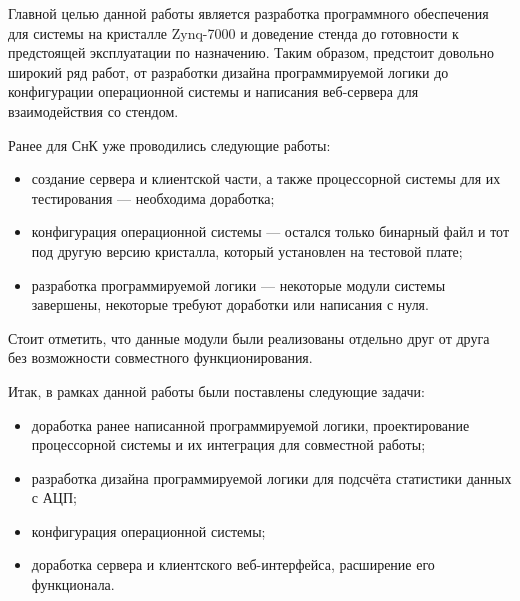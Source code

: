 Главной целью данной работы является разработка программного обеспечения для системы на кристалле Zynq-7000 и доведение стенда до готовности к предстоящей эксплуатации по назначению. Таким образом, предстоит довольно широкий ряд работ, от разработки дизайна программируемой логики до конфигурации операционной системы и написания веб-сервера для взаимодействия со стендом.\par
Ранее для СнК уже проводились следующие работы:
\begin{itemize}
    \item создание сервера и клиентской части, а также процессорной системы для их тестирования --- необходима доработка;
    \item конфигурация операционной системы --- остался только бинарный файл и тот под другую версию кристалла, который установлен на тестовой плате;
    \item разработка программируемой логики --- некоторые модули системы завершены, некоторые требуют доработки или написания с нуля.
\end{itemize}\par
Стоит отметить, что данные модули были реализованы отдельно друг от друга без возможности совместного функционирования.\par
Итак, в рамках данной работы были поставлены следующие задачи:
\begin{itemize}
    \item доработка ранее написанной программируемой логики, проектирование процессорной системы и их интеграция для совместной работы;
    \item разработка дизайна программируемой логики для подсчёта статистики данных с АЦП;
    \item конфигурация операционной системы;
    \item доработка сервера и клиентского веб-интерфейса, расширение его функционала.
\end{itemize}


